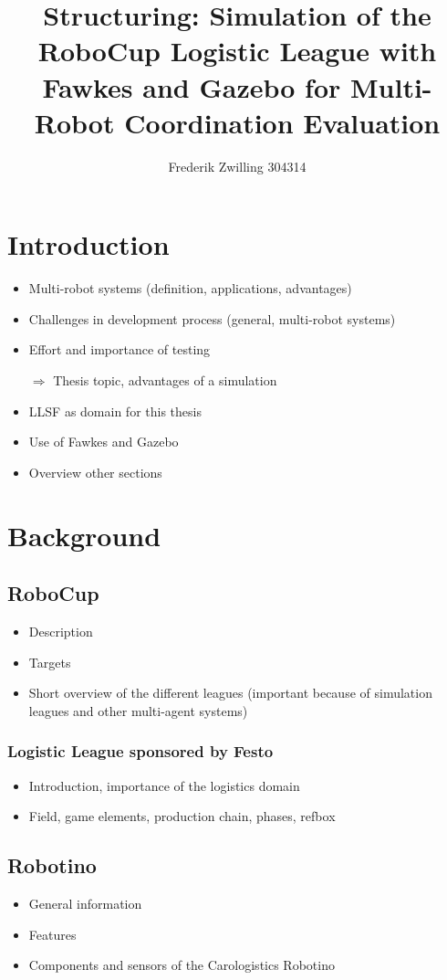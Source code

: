 \documentclass[a4paper,11pt]{article}
\author{Frederik Zwilling 304314}
\title{Structuring: Simulation of the RoboCup Logistic League with Fawkes and Gazebo for Multi-Robot Coordination Evaluation}
\begin{document}
\maketitle
\tableofcontents
\newpage




\section{Introduction}
\begin{itemize}
\item Multi-robot systems (definition, applications, advantages)
\item Challenges in development process (general, multi-robot systems)
\item Effort and importance of testing
\item[$\Rightarrow$] Thesis topic, advantages of a simulation
\item LLSF as domain for this thesis
\item Use of Fawkes and Gazebo
\item Overview other sections
\end{itemize}

\section{Background}
\subsection{RoboCup}
\begin{itemize}
\item Description
\item Targets
\item Short overview of the different leagues (important because of simulation leagues and other multi-agent systems)
\end{itemize}
\subsubsection{Logistic League sponsored by Festo}
\begin{itemize}
\item Introduction, importance of the logistics domain
\item Field, game elements, production chain, phases, refbox
\end{itemize}
\subsection{Robotino}
\begin{itemize}
\item General information
\item Features
\item Components and sensors of the Carologistics Robotino
\end{itemize}
\end{document}
